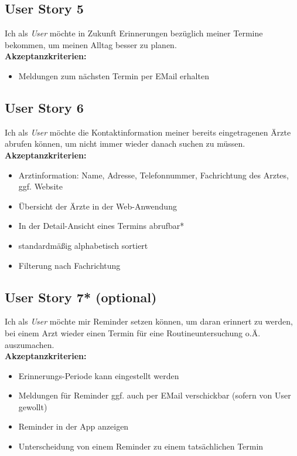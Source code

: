 \documentclass[conference]{IEEEtran}
\begin{document}
\subsection{User Story 5}
Ich als \textit{User} möchte in Zukunft Erinnerungen bezüglich meiner Termine bekommen, um meinen Alltag besser zu planen.\\
\textbf{Akzeptanzkriterien:}
\begin{itemize}
	\item Meldungen zum nächsten Termin per EMail erhalten
\end{itemize}

\subsection{User Story 6}
Ich als \textit{User} möchte die Kontaktinformation meiner bereits eingetragenen Ärzte abrufen können, um nicht immer wieder danach suchen zu müssen.\\
\textbf{Akzeptanzkriterien:}
\begin{itemize}
	\item Arztinformation: Name, Adresse, Telefonnummer, Fachrichtung des Arztes, ggf. Website 
	\item Übersicht der Ärzte in der Web-Anwendung
	\item In der Detail-Ansicht eines Termins abrufbar*
	\item standardmäßig alphabetisch sortiert
	\item Filterung nach Fachrichtung
\end{itemize}

\subsection{User Story 7* (optional)}
Ich als \textit{User} möchte mir Reminder setzen können, um daran erinnert zu werden, bei einem Arzt wieder einen Termin für eine Routineuntersuchung o.Ä. auszumachen.\\
\textbf{Akzeptanzkriterien:}
\begin{itemize}
	\item Erinnerungs-Periode kann eingestellt werden
	\item Meldungen für Reminder ggf. auch per EMail verschickbar (sofern von User gewollt)
	\item Reminder in der App anzeigen
	\item Unterscheidung von einem Reminder zu einem tatsächlichen Termin
\end{itemize}
\end{document}
